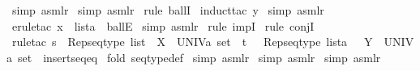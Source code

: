 \begin{isabellebody}
\isamarkupfalse%
\ {\isacharparenleft}simp\ {\isacharparenleft}asm{\isacharunderscore}lr{\isacharparenright}{\isacharparenright}\isanewline
{}\isamarkupfalse%
\ {\isacharparenleft}simp\ {\isacharparenleft}asm{\isacharunderscore}lr{\isacharparenright}{\isacharparenright}\isanewline
{}\isamarkupfalse%
\ {\isacharparenleft}rule\ ballI{\isacharparenright}\isanewline
{}\isamarkupfalse%
\ {\isacharparenleft}induct{\isacharunderscore}tac\ {\isachardoublequoteopen}y{\isachardoublequoteclose}{\isacharparenright}\isanewline
{}\isamarkupfalse%
\ {\isacharparenleft}simp\ {\isacharparenleft}asm{\isacharunderscore}lr{\isacharparenright}{\isacharparenright}\isanewline
{}\isamarkupfalse%
\ {\isacharparenleft}erule{\isacharunderscore}tac\ x\ {\isacharequal}\ {\isachardoublequoteopen}lista{\isachardoublequoteclose}\ \ ballE{\isacharparenright}\isanewline
{}\isamarkupfalse%
\ {\isacharparenleft}simp\ {\isacharparenleft}asm{\isacharunderscore}lr{\isacharparenright}{\isacharparenright}\isanewline
{}\isamarkupfalse%
\ {\isacharparenleft}rule\ impI{\isacharparenright}\isanewline
{}\isamarkupfalse%
\ {\isacharparenleft}rule\ conjI{\isacharparenright}\isanewline
{}\isamarkupfalse%
\ {\isacharparenleft}rule{\isacharunderscore}tac\ s\ {\isacharequal}\ {\isachardoublequoteopen}Rep{\isacharunderscore}seqtype\ list{\isachardoublequoteclose}\ \ X\ {\isacharequal}\ {\isachardoublequoteopen}UNIV{\isacharcolon}{\isacharcolon}{\isacharprime}a\ set{\isachardoublequoteclose}\ \ t\ {\isacharequal}\ {\isachardoublequoteopen}\ {\isacharparenleft}Rep{\isacharunderscore}seqtype\ lista{\isacharparenright}\ {\isachardoublequoteclose}\ \ Y\ {\isacharequal}\ {\isachardoublequoteopen}UNIV{\isacharcolon}{\isacharcolon}{\isacharprime}a\ set{\isachardoublequoteclose}\ \ insertseq{\isacharunderscore}eq{\isacharparenright}\isanewline
{}\isamarkupfalse%
\ {\isacharparenleft}fold\ seqtype{\isacharunderscore}def{\isacharparenright}\isanewline
{}\isamarkupfalse%
\ {\isacharparenleft}simp\ {\isacharparenleft}asm{\isacharunderscore}lr{\isacharparenright}{\isacharparenright}\isanewline
{}\isamarkupfalse%
\ {\isacharparenleft}simp\ {\isacharparenleft}asm{\isacharunderscore}lr{\isacharparenright}{\isacharparenright}\isanewline
{}\isamarkupfalse%
\ {\isacharparenleft}simp\ {\isacharparenleft}asm{\isacharunderscore}lr{\isacharparenright}{\isacharparenright}\isanewline

\end{isabellebody}

